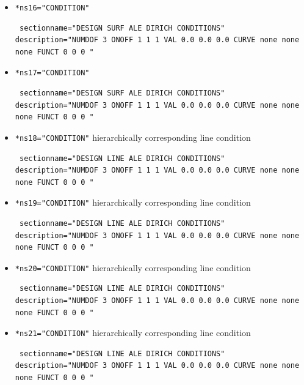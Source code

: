 \begin{itemize}
 \item \verb|*ns16="CONDITION"|
\begin{small} \begin{verbatim} sectionname="DESIGN SURF ALE DIRICH CONDITIONS"
description="NUMDOF 3 ONOFF 1 1 1 VAL 0.0 0.0 0.0 CURVE none none none FUNCT 0 0 0 "
\end{verbatim} \end{small}

 \item \verb|*ns17="CONDITION"|
\begin{small} \begin{verbatim} sectionname="DESIGN SURF ALE DIRICH CONDITIONS"
description="NUMDOF 3 ONOFF 1 1 1 VAL 0.0 0.0 0.0 CURVE none none none FUNCT 0 0 0 "
\end{verbatim} \end{small}

 \item \verb|*ns18="CONDITION"| \qquad hierarchically corresponding line condition
\begin{small} \begin{verbatim} sectionname="DESIGN LINE ALE DIRICH CONDITIONS"
description="NUMDOF 3 ONOFF 1 1 1 VAL 0.0 0.0 0.0 CURVE none none none FUNCT 0 0 0 "
\end{verbatim} \end{small}

 \item \verb|*ns19="CONDITION"| \qquad hierarchically corresponding line condition
\begin{small} \begin{verbatim} sectionname="DESIGN LINE ALE DIRICH CONDITIONS"
description="NUMDOF 3 ONOFF 1 1 1 VAL 0.0 0.0 0.0 CURVE none none none FUNCT 0 0 0 "
\end{verbatim} \end{small}

 \item \verb|*ns20="CONDITION"| \qquad hierarchically corresponding line condition
\begin{small} \begin{verbatim} sectionname="DESIGN LINE ALE DIRICH CONDITIONS"
description="NUMDOF 3 ONOFF 1 1 1 VAL 0.0 0.0 0.0 CURVE none none none FUNCT 0 0 0 "
\end{verbatim} \end{small}

 \item \verb|*ns21="CONDITION"| \qquad hierarchically corresponding line condition
\begin{small} \begin{verbatim} sectionname="DESIGN LINE ALE DIRICH CONDITIONS"
description="NUMDOF 3 ONOFF 1 1 1 VAL 0.0 0.0 0.0 CURVE none none none FUNCT 0 0 0 "
\end{verbatim} \end{small}


\end{itemize}

